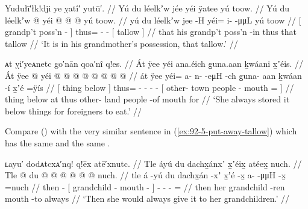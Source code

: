 \ex\label{ex:92-8-his-grandmother-has-the-tallow}%
%
\begingl
	\glpreamble	Yudułī′łk!dji ye ỵatî′ yutū′. //
	\glpreamble	Yú du léelkʼw jée yéi ÿatee yú toow. //
	\gla	{} Yú du léelkʼw  @ {} {}
		yéi @  @ {} @ {}
		{} yú toow. {} //
	\glb	{} yú du léelkʼw jee -H {}
		yéi= i-  -μμL
		{} yú toow {} //
	\glc	{}[   grandp’t poss’n - {}]
		thus= -  -
		{}[  tallow {}] //
	\gld	{} that his grandp’t poss’n -in {}
		thus  {} {}
		{} that tallow {} //
	\glft	‘It is in his grandmother’s possession, that tallow.’
		//
\endgl%
\xe

\ex\label{ex:92-9-stored-things-for-foreigners}%
%
\begingl
	\glpreamble	ᴀt ỵi′yeᴀnetc go′nān qoa′nî q!es. //
	\glpreamble	Át ÿee yéi ana.éich g̱una.aan ḵwáani x̱ʼéis. //
	\gla	{} Át ÿee @ {} {}
		yéi @  @ {} @ {} @ {} @ {}
		{}  @ {}  @ {}  @ {} {} //
	\glb	{} át ÿee {} {}
		yéi= a- n-  -eμH -ch
		{} g̱una- aan ḵwáan -í x̱ʼé =ÿís {} //
	\glc	{}[ thing below \· {}]
		thus= - -  - -
		{}[ other- town people - mouth = {}] //
	\gld	{} thing below \·at {}
		thus  {} {} {} {}
		{} other- land people -of mouth \•for {} //
	\glft	‘She always stored it below things for foreigners to eat.’
		//
\endgl
\xe


Compare (\lastx) with the very similar sentence in (\ref{ex:92-5-put-away-tallow}) which has the same  and the same .

\ex\label{ex:92-10-give-to-grandchildren}%
%
\begingl
	\glpreamble	ʟayu′ dodᴀtcxᴀ′nq! q!ēx atē′xnutc. //
	\glpreamble	Tle áyú du dachx̱ánxʼ x̱ʼéix̱ atéex̱ nuch. //
	\gla	Tle  @ {}
		{} du  @ {}  @ {} {}
		 @ {} @ {} @ {} @ \•nuch. //
	\glb	tle á -yú
		{} du dachx̱án -xʼ x̱ʼé -x̱ {}
		a-  -μμH -x̱ =nuch //
	\glc	then  -
		{}[  grandchild - mouth - {}]
		-  - - = //
	\gld	then  {}
		{} her grandchild -ren mouth -to {}
		 {} {} {} \•always //
	\glft	‘Then she would always give it to her grandchildren.’
		//
\endgl
\xe

